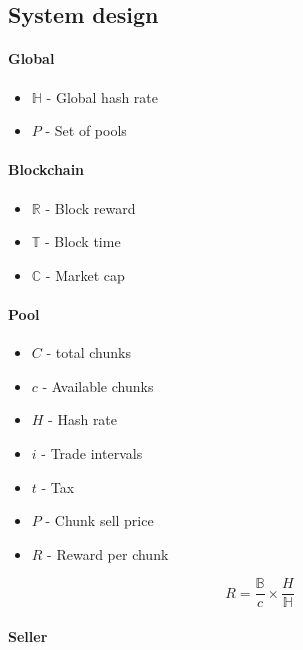 \subsection{System design} %

\paragraph{Global} 

\begin{itemize}
  \item $\mathbb{H}$ - Global hash rate
  \item $P$ - Set of pools
\end{itemize}

\paragraph{Blockchain}

\begin{itemize}
  \item $\mathbb{R}$ - Block reward
  \item $\mathbb{T}$ - Block time
  \item $\mathbb{C}$ - Market cap
\end{itemize}

\paragraph{Pool}

\begin{itemize}
  \item $C$ - total chunks
  \item $c$ - Available chunks
  \item $H$ - Hash rate
  \item $i$ - Trade intervals 
  \item $t$ - Tax
  \item $P$ - Chunk sell price
  \item $R$ - Reward per chunk
\end{itemize}

\begin{equation}
  R = \frac{\mathbb{B}}{c} \times \frac{H}{\mathbb{H}}
\end{equation}

\paragraph{Seller}

